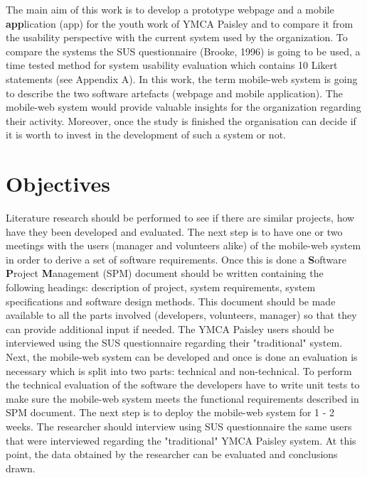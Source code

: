 \documentclass[version=last,fontsize=13pt]{scrartcl}
\begin{document}
\indent
The main aim of this work is to develop a prototype webpage and a mobile \textbf{app}lication (app) for the youth work of YMCA Paisley and to compare it from the usability perspective with the current system used by the organization. To compare the systems the SUS questionnaire (Brooke, 1996) is going to be used, a time tested method for system usability evaluation which contains 10 Likert statements (see Appendix A). In this work, the term mobile-web system is going to describe the two software artefacts (webpage and mobile application). The mobile-web system would provide valuable insights for the organization  regarding their activity. Moreover, once the study is finished the organisation can decide if it is worth to invest in the development of such a system  or not. 

\section{Objectives}%
 Literature research should be performed to see if there are similar projects, how have they been developed and evaluated. The next step is to have one or two meetings with the users (manager and volunteers alike) of the mobile-web system in order to derive a  set of software requirements. Once this is done a \textbf{S}oftware \textbf{P}roject \textbf{M}anagement (SPM) document should be written containing the following headings: description of project, system requirements, system specifications and software design methods. This document should be made available to all the parts involved (developers, volunteers, manager) so that they can provide additional input if needed. The YMCA Paisley users should be interviewed using the SUS questionnaire regarding their "traditional" system. Next, the mobile-web system can be developed and once is done an evaluation is necessary which is split into two parts: technical  and non-technical. To perform the technical evaluation of the software the developers have to write unit tests to make sure the mobile-web system meets the functional requirements described in SPM document. The next step is to deploy the mobile-web system for 1 - 2 weeks. The researcher should interview using SUS questionnaire the same users that were interviewed regarding the "traditional" YMCA Paisley system. At this point, the data obtained by the researcher can be evaluated and conclusions drawn.
\end{document}

